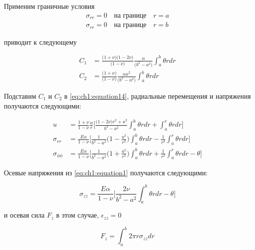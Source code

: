 Применим граничные условия
\begin{equation}
	\label{eq:ch1:equation16}
	\begin{split}
		\sigma_{rr} = 0 \quad \text{на границе} \quad r=a\\
		\sigma_{rr} = 0 \quad \text{на границе} \quad r=b
	\end{split}
\end{equation}

приводит к следующему

\begin{equation*}
	\begin{split}
		C_1 &= \frac{\big(1+\nu \big)\big(1-2\nu \big)}{\big(1-\nu \big)}  \frac{\alpha}{\big(b^2-a^2 \big)} \int_a^b \theta rdr\\
		C_2 &= \frac{\big(1+\nu \big)}{\big(1-\nu \big)}\frac{\alpha a^2}{\big(b^2-a^2 \big)}\int_a^b \theta rdr
	\end{split}
\end{equation*}

Подставим \(C_1\) и \(C_2\) в \cref{eq:ch1:equation14}, радиальные перемещения и напряжения получаются следующими:

\begin{equation}
	\label{eq:ch1:equation17}
	\begin{split}
		u &= \frac{1+\nu}{1-\nu} \frac{\alpha}{r} \big[ \frac{\big( 1-2\nu \big) r^2 +a^2}{b^2-a^2} \int_a^b \theta rdr + \int_a^r \theta r dr\big]\\
		\sigma_{rr} &= \frac{E \alpha}{1-\nu}\big[ \frac{1}{b^2-a^2} \big(1-\frac{a^2}{r^2} \big)\int_a^b \theta rdr -\frac{1}{r^2}\int_a^r \theta r dr\big]\\
		\sigma_{\phi\phi} &= \frac{E \alpha}{1-\nu}\big[ \frac{1}{b^2-a^2}\big(1+\frac{a^2}{r^2} \big)\int_a^b \theta rdr +\frac{1}{r^2}\int_a^r \theta r dr - \theta \big]
	\end{split}
\end{equation}	
	
Осевые напряжения из \cref{eq:ch1:equation1}	получаются следующими:

\begin{equation}
	\label{eq:ch1:equation18}
	\sigma_{zz} = \frac{E \alpha}{1-\nu}\big[ \frac{2\nu}{b^2-a^2}\int_a^b \theta rdr  - \theta \big]	
\end{equation}

и осевая сила \(F_z\) в этом случае, \(\epsilon_{zz}=0\)

\begin{equation}
	\label{eq:ch1:equation19}
	F_z = \int_a^b 2 \pi r \sigma_{zz} dr
\end{equation}


